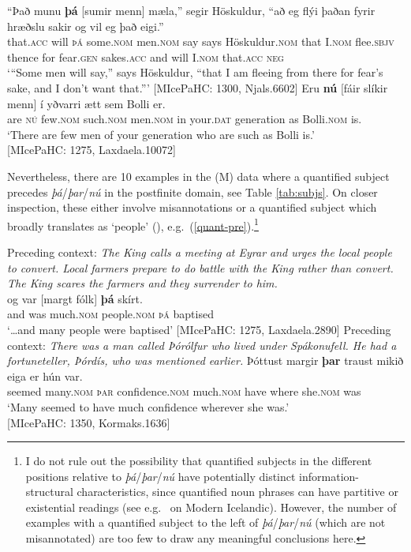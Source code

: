 \documentclass[output=paper,colorlinks,citecolor=brown]{langscibook}
\begin{document}
\ea \label{quant-post}
\ea \label{aux-2} 
\gll ``Það munu \textbf{þá} [sumir menn] mæla,'' segir Höskuldur, ``að eg flýi þaðan fyrir
hræðslu sakir og vil eg það eigi.''\\ 
that.\textsc{acc} will \textsc{þá} some.\textsc{nom} men.\textsc{nom} say says Höskuldur.\textsc{nom} that I.\textsc{nom}  flee.\textsc{sbjv} thence for fear.\textsc{gen} sakes.\textsc{acc} and will I.\textsc{nom} that.\textsc{acc} \textsc{neg}\\
\glt ‘``Some men will say,'' says Höskuldur, ``that I am fleeing from there for fear's sake, and I don't want that.'''  \hfill [MIcePaHC: 1300, Njals.6602]
\ex 
\gll Eru \textbf{nú} [fáir slíkir menn] í yðvarri ætt sem Bolli er.\\
are \textsc{nú} few.\textsc{nom} such.\textsc{nom} men.\textsc{nom} in your.\textsc{dat} generation as Bolli.\textsc{nom} is.\\
\glt `There are few men of your generation who are such as Bolli is.' \\ \hfill [MIcePaHC: 1275, Laxdaela.10072]
\z 
\z

\largerpage
\noindent Nevertheless, there are 10 examples in the (M) data where a quantified subject precedes \textit{þá}/\textit{þar}/\textit{nú} in the postfinite domain, see Table \ref{tab:subjs}. On closer inspection, these either involve misannotations or a quantified subject which broadly translates as `people' (), e.g.~(\ref{quant-pre}).\footnote{I do not rule out the possibility that quantified subjects in the different positions relative to \textit{þá}/\textit{þar}/\textit{nú} have potentially distinct information-structural characteristics, since quantified noun phrases can have partitive or existential readings (see e.g.~\citealp[79]{jonsson2002} on Modern Icelandic). However, the number of examples with a quantified subject to the left of \textit{þá}/\textit{þar}/\textit{nú} (which are not misannotated) are too few to draw any meaningful conclusions here.}


\ea \label{quant-pre}
\ea \label{aux-1}
Preceding context: \textit{The King calls a meeting at Eyrar and urges the local people to convert. Local farmers prepare to do battle with the King rather than convert. The King scares the farmers and they surrender to him.}\\
\gll {\dots}og var [margt fólk] \textbf{þá} skírt.\\
and was much.\textsc{nom} people.\textsc{nom} \textsc{þá} baptised\\
\glt `{\dots}and many people were baptised' \hfill [MIcePaHC: 1275, Laxdaela.2890]
\ex 
Preceding context: \textit{There was a man called Þórólfur who lived under Spákonufell. He had a fortuneteller, Þórdís, who was mentioned earlier. }
\gll Þóttust margir \textbf{þar} traust mikið eiga er hún var.\\
seemed many.\textsc{nom} \textsc{þar} confidence.\textsc{nom} much.\textsc{nom} have where she.\textsc{nom} was\\
\glt `Many seemed to have much confidence wherever she was.' \\ \hfill [MIcePaHC: 1350, Kormaks.1636]
\z 
\z 
\end{document}
